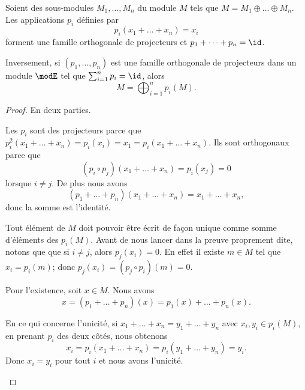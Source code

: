 \begin{theorem}     \label{ThoProjModpAlsUR}
	Soient des sous-modules \( M_1,\ldots,M_n\) du module \( M \) tels que \( M=M_1\oplus\ldots\oplus M_n\). Les applications \( p_i\) définies par
	\begin{equation}
		p_i(x_1+\ldots+x_n)=x_i
	\end{equation}
	forment une famille orthogonale de projecteurs et \( p_1+\cdots +p_n=\id\).

	Inversement, si \( (p_1,\ldots, p_n)\) est une famille orthogonale de projecteurs dans un module \( \modE\) tel que \( \sum_{i=1}^np_i=\id\), alors
	\begin{equation}
		M=\bigoplus_{i=1}^np_i(M).
	\end{equation}
\end{theorem}

\begin{proof}
	En deux parties.
	\begin{subproof}
		Les \( p_i\) sont des projecteurs parce que \( p_i^2(x_1+\ldots+x_n)=p_i(x_i)=x_1=p_i(x_1+\ldots+x_n)\). Ils sont orthogonaux parce que
		\begin{equation}
			(p_i\circ p_j)(x_1+\ldots+x_n)=p_i(x_j)=0
		\end{equation}
		lorsque \( i\neq j\). De plus nous avons
		\begin{equation}
			(p_1+\ldots+p_n)(x_1+\ldots+x_n)=x_1+\ldots+x_n,
		\end{equation}
		donc la somme est l'identité.

		Tout élément de \( M\) doit pouvoir être écrit de façon unique comme somme d'éléments des \( p_i(M)\). Avant de nous lancer dans la preuve proprement dite, notons que que si \( i\neq j\), alors \( p_j(x_i)=0\). En effet il existe \( m\in M\) tel que \( x_i=p_i(m)\); donc \( p_j(x_i)=(p_j\circ p_i)(m)=0\).

		Pour l'existence, soit \( x\in M\). Nous avons
		\begin{equation}
			x=(p_1+\ldots+p_n)(x)=p_1(x)+\ldots+p_n(x).
		\end{equation}

		En ce qui concerne l'unicité, si \( x_1+\ldots+x_n=y_1+\ldots+y_n\) avec \( x_i,y_i\in p_i(M)\), en prenant \( p_i\) des deux côtés, nous obtenons
		\begin{equation}
			x_i=p_i(x_1+\ldots+x_n)=p_i(y_1+\ldots+y_n)=y_i.
		\end{equation}
		Donc \( x_i=y_i\) pour tout \( i\) et nous avons l'unicité.
	\end{subproof}
\end{proof}

